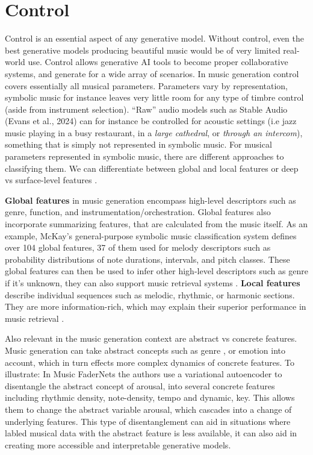 \section{Control}
Control is an essential aspect of any generative model. Without control, even the best generative models producing beautiful music would be of very limited real-world use. Control allows generative AI tools to become proper collaborative systems, and generate for a wide array of scenarios. In music generation control covers essentially all musical parameters. Parameters vary by representation, symbolic music for instance leaves very little room for any type of timbre control (aside from instrument selection). “Raw” audio models such as Stable Audio (Evans et al., 2024) can for instance be controlled for acoustic settings (i.e jazz music playing in a busy restaurant, in a \textit{large cathedral}, or \textit{through an intercom}), something that is simply not represented in symbolic music. For musical parameters represented in symbolic music, there are different approaches to classifying them. We can differentiate between global and local features \cite{Van_Kranenburg_Volk_Wiering_2013} or deep vs surface-level features \cite{Blacking_1971}. 

\textbf{Global features} in music generation encompass high-level descriptors such as genre, function, and instrumentation/orchestration. Global features also incorporate summarizing features, that are calculated from the music itself. As an example, McKay’s \cite{McKay_2004} general-purpose symbolic music classification system defines over 104 global features, 37 of them used for melody descriptors such as probability distributions of note durations, intervals, and pitch classes. These global features can then be used to infer other high-level descriptors such as genre if it's unknown, they can also support music retrieval systems \cite{Van_Kranenburg_Volk_Wiering_2013}.  \textbf{Local features} describe individual sequences such as melodic, rhythmic, or harmonic sections. They are more information-rich, which may explain their superior performance in music retrieval \cite{Van_Kranenburg_Volk_Wiering_2013}. 

Also relevant in the music generation context are abstract vs concrete features. Music generation can take abstract concepts such as genre \cite{Rouard_Adi_Copet_Roebel_Défossez_musicgenstyle_2024}, \cite{Lu_Xu_Kang_Yu_Xing_Tan_Bian_MuseCoco_2023} or emotion \cite{Tan_Herremans_2020} \cite{Lu_Xu_Kang_Yu_Xing_Tan_Bian_MuseCoco_2023} into account, which in turn effects more complex dynamics of concrete features. To illustrate: In Music FaderNets \cite{Tan_Herremans_2020} the authors use a variational autoencoder to disentangle the abstract concept of arousal, into several concrete features including rhythmic density, note-density, tempo and dynamic, key. This allows them to change the abstract variable arousal, which cascades into a change of underlying features. This type of disentanglement can aid in situations where labled musical data with the abstract feature is less available, it can also aid in creating more accessible and interpretable generative models.

